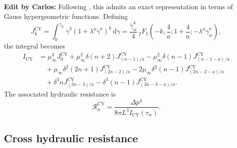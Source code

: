 \documentclass[lineno]{jfm}
\newcommand{\cbp}[1]{{\color{blue} \textbf{Edit by Carlos:} #1}}
\begin{document}
\cbp{Following \citet{Sochi2015}, this admits an exact representation in terms of Gauss hypergeometric functions. Defining
\begin{equation}
J_k^{\mathrm{CY}}
=
\int_{0}^{\dot{\gamma}_w}\dot{\gamma}^3(1+\lambda^a\dot{\gamma}^a)^k\,\mathrm{d}\dot{\gamma}
=
\frac{\dot{\gamma}_w^4}{4}\,
{}_2F_1\!\left(-k,\frac{4}{a};1+\frac{4}{a};-\lambda^a\dot{\gamma}_w^a\right),
\label{eq:Jk_CY}
\end{equation}
the integral becomes
\begin{align}
I_{\mathrm{CY}}
&=\mu_{\infty}^3J_0^{\mathrm{CY}}
+\mu_{\infty}^2\delta(n+2)J_{(n-1)/a}^{\mathrm{CY}}
-\mu_{\infty}^2\delta(n-1)J_{(n-1-a)/a}^{\mathrm{CY}}\nonumber\\
&\quad
+\mu_{\infty}\delta^2(2n+1)J_{(2n-2)/a}^{\mathrm{CY}}
-2\mu_{\infty}\delta^2(n-1)J_{(2n-2-a)/a}^{\mathrm{CY}}\nonumber\\
&\quad
+\delta^3nJ_{(3n-3)/a}^{\mathrm{CY}}
-\delta^3(n-1)J_{(3n-3-a)/a}^{\mathrm{CY}}.
\label{eq:I_CY_final}
\end{align}}
The associated hydraulic resistance is
\begin{equation}
\mathcal{R}_{\mu}^{\mathrm{CY}}
=
\frac{\Delta p^4}{8\pi L^3 I_{\mathrm{CY}}(\tau_w)}.
\label{eq:R_CY}
\end{equation}

\subsection{Cross hydraulic resistance}
\end{document}
